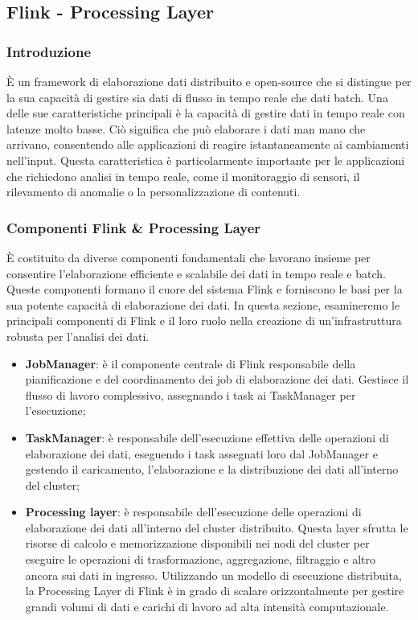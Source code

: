 \subsection{Flink - Processing Layer}
\subsubsection{Introduzione}
È un framework di elaborazione dati distribuito e open-source che si distingue per la sua capacità di gestire sia dati di flusso in tempo reale che dati batch. Una delle sue caratteristiche principali è la capacità di gestire dati in tempo reale con latenze molto basse. Ciò significa che può elaborare i dati man mano che arrivano, consentendo alle applicazioni di reagire istantaneamente ai cambiamenti nell'input. Questa caratteristica è particolarmente importante per le applicazioni che richiedono analisi in tempo reale, come il monitoraggio di sensori, il rilevamento di anomalie o la personalizzazione di contenuti.
\subsubsection{Componenti Flink \& Processing Layer}
È costituito da diverse componenti fondamentali che lavorano insieme per consentire l'elaborazione efficiente e scalabile dei dati in tempo reale e batch. Queste componenti formano il cuore del sistema Flink e forniscono le basi per la sua potente capacità di elaborazione dei dati. In questa sezione, esamineremo le principali componenti di Flink e il loro ruolo nella creazione di un'infrastruttura robusta per l'analisi dei dati.
\begin{itemize}
    \item \textbf{JobManager}: è il componente centrale di Flink responsabile della pianificazione e del coordinamento dei job di elaborazione dei dati. Gestisce il flusso di lavoro complessivo, assegnando i task ai TaskManager per l'esecuzione;
    \item \textbf{TaskManager}: è responsabile dell'esecuzione effettiva delle operazioni di elaborazione dei dati, eseguendo i task assegnati loro dal JobManager e gestendo il caricamento, l'elaborazione e la distribuzione dei dati all'interno del cluster;
    \item \textbf{Processing layer}: è responsabile dell'esecuzione delle operazioni di elaborazione dei dati all'interno del cluster distribuito. Questa layer sfrutta le risorse di calcolo e memorizzazione disponibili nei nodi del cluster per eseguire le operazioni di trasformazione, aggregazione, filtraggio e altro ancora sui dati in ingresso. Utilizzando un modello di esecuzione distribuita, la Processing Layer di Flink è in grado di scalare orizzontalmente per gestire grandi volumi di dati e carichi di lavoro ad alta intensità computazionale.
\end{itemize}

